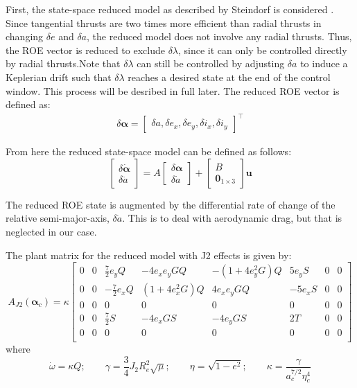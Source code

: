 First, the state-space reduced model as described by Steindorf is considered \cite{steindorf2017constrained}. Since tangential thrusts are two times more efficient than radial thrusts in changing $\delta e$ and $\delta a$, the reduced model does not involve any radial thrusts. Thus, the ROE vector is reduced to exclude $\delta \lambda$, since it can only be controlled directly by radial thrusts.Note that $\delta \lambda$ can still be controlled by adjusting $\delta a$ to induce a Keplerian drift such that $\delta \lambda$ reaches a desired state at the end of the control window. This process will be desribed in full later. The reduced ROE vector is defined as: 
\begin{align*}
\delta \bm{\alpha} = \begin{bmatrix} \delta a, \delta e_x, \delta e_y, \delta i_x, \delta i_y \end{bmatrix}^\top
\end{align*}

From here the reduced state-space model can be defined as follows:
\begin{equation}
\begin{bmatrix}
\delta \dot{\bm{\alpha}} \\
\delta \ddot{a}
\end{bmatrix}
=
A
\begin{bmatrix}
\delta \bm{\alpha} \\
\delta \dot{a}
\end{bmatrix}
+
\begin{bmatrix}
B \\
\bm{0}_{1 \times 3}
\end{bmatrix}
\bm{u}
\label{eq:reduced_state_space}
\end{equation}

The reduced ROE state is augmented by the differential rate of change of the relative semi-major-axis, $\delta \dot{a}$. This is to  deal with aerodynamic drag, but that is neglected in our case. 

The plant matrix for the reduced model with J2 effects is given by:
\begin{equation}
A_{J2}(\bm{\alpha}_c) = \kappa
\begin{bmatrix}
0 & 0 & \frac{7}{2} e_y Q & -4 e_x e_y G Q & -(1 + 4 e_y^2 G) Q & 5 e_y S & 0 & 0 \\
0 & 0 & -\frac{7}{2} e_x Q & (1 + 4 e_x^2 G) Q & 4 e_x e_y G Q & -5 e_x S & 0 & 0 \\
0 & 0 & 0 & 0 & 0 & 0 & 0 & 0 \\
0 & 0 & \frac{7}{2} S & -4 e_x G S & -4 e_y G S & 2 T & 0 & 0 \\
0 & 0 & 0 & 0 & 0 & 0 & 0 & 0 \\
\end{bmatrix}
\end{equation} \label{eq:continuous_control_A}
\noindent where
\[
\dot{\omega} = \kappa Q; \qquad \gamma = \frac{3}{4} J_2 R_e^2 \sqrt{\mu}; \qquad \eta = \sqrt{1 - e^2}; \qquad \kappa = \frac{\gamma}{a_c^{7/2} \eta_c^4}
\]

